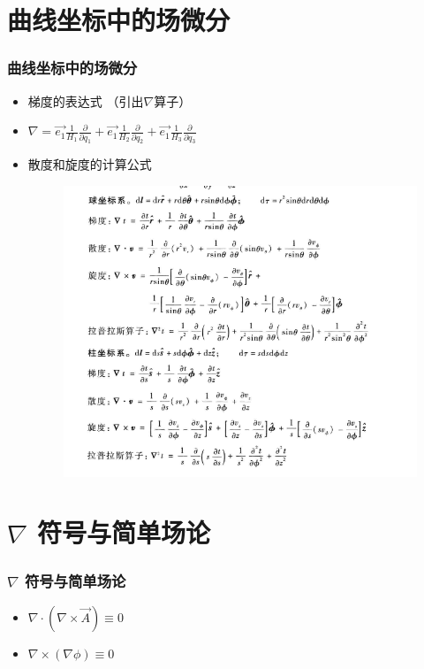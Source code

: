 \documentclass[10pt]{beamer}
\begin{document}
\section{曲线坐标中的场微分}
\begin{frame}
    \frametitle{曲线坐标中的场微分}
    \begin{itemize}
        \item 梯度的表达式 （引出$\nabla $算子）
        \item $\nabla = \vec{e_1} \frac{1}{H_1}\frac{\partial}{\partial q_1}+\vec{e_1} \frac{1}{H_2}\frac{\partial}{\partial q_2}  +\vec{e_1} \frac{1}{H_3}\frac{\partial}{\partial q_3}$
        \item 散度和旋度的计算公式
        \begin{figure}
            \includegraphics[scale = 0.4]{fig1.png}
        \end{figure}
    \end{itemize}
\end{frame}


\section{ $\nabla$ 符号与简单场论}
\begin{frame}
    \frametitle{ $\nabla$ 符号与简单场论}
    \begin{itemize}
        \item $\nabla \cdot (\nabla \times \vec{A}) \equiv 0$
        \item $\nabla \times (\nabla \phi) \equiv 0$
    \end{itemize}
\end{frame}
\end{document}
